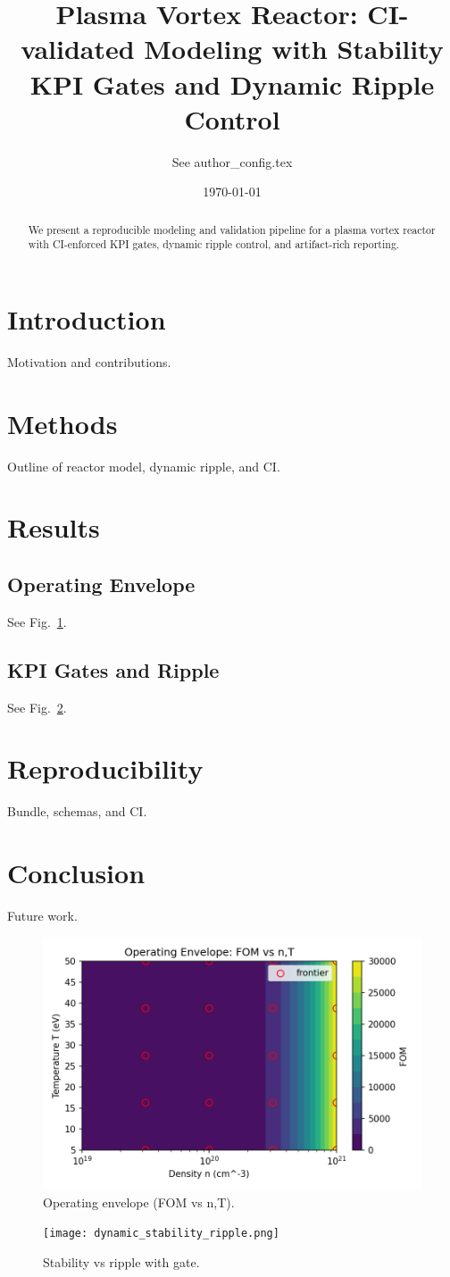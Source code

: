 \documentclass[11pt]{article}
\title{Plasma Vortex Reactor: CI-validated Modeling with Stability KPI Gates and Dynamic Ripple Control}
\author{See author\_config.tex}
\date{\today}
\begin{document}
\maketitle
\begin{abstract}
We present a reproducible modeling and validation pipeline for a plasma vortex reactor with CI-enforced KPI gates, dynamic ripple control, and artifact-rich reporting.
\end{abstract}
\section{Introduction}
Motivation and contributions.
\section{Methods}
Outline of reactor model, dynamic ripple, and CI.
\section{Results}
\subsection{Operating Envelope} See Fig.~\ref{fig:envelope}.
\subsection{KPI Gates and Ripple} See Fig.~\ref{fig:ripple}.
\section{Reproducibility}
Bundle, schemas, and CI.
\section{Conclusion}
Future work.
\begin{figure}[h]
\centering
\includegraphics[width=0.7\linewidth]{operating_envelope.png}
\caption{Operating envelope (FOM vs n,T).}\label{fig:envelope}
\end{figure}
\begin{figure}[h]
\centering
\texttt{[image: dynamic\_stability\_ripple.png]}
\caption{Stability vs ripple with gate.}\label{fig:ripple}
\end{figure}
\end{document}
